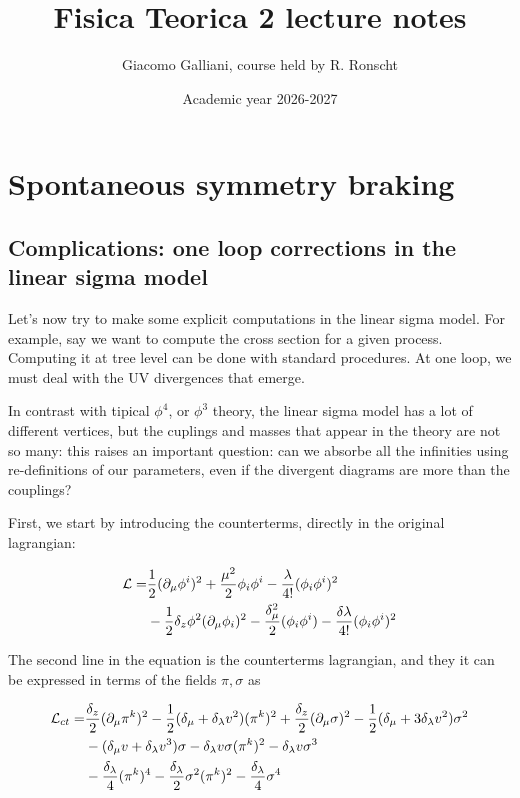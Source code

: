 \documentclass[11pt]{report}
\title{\Huge{\textbf{Fisica Teorica 2 lecture notes}}}
\author{Giacomo Galliani, course held by R. Ronscht}
\date{Academic year 2026-2027}
\renewcommand{\contentsname}{Indice}
\begin{document}
\maketitle
\newpage%
\pdfbookmark[section]{\contentsname}{toc}
\tableofcontents
\pagebreak

\chapter{Spontaneous symmetry braking}

\section{Complications: one loop corrections in the linear sigma model}

Let's now try to make some explicit computations in the linear sigma model. For example, say we want to compute the cross section for a given process. Computing it at tree level can be done with standard procedures. At one loop, we must deal with the UV divergences that emerge. 

In contrast with tipical \(\phi^4\), or \(\phi^3\) theory, the linear sigma model has a lot of different vertices, but the cuplings and masses that appear in the theory are not so many: this raises an important question: can we absorbe all the infinities using re-definitions of our parameters, even if the divergent diagrams are more than the couplings? 

First, we start by introducing the counterterms, directly in the original lagrangian: 

\begin{align}
    \mathcal{L} = &\frac{1}{2}(\partial_\mu \phi^i)^2 +\frac{\mu^2}{2}\phi_i \phi^i - \frac{\lambda}{4!}(\phi_i \phi^i)^2 \notag \\
    &-\frac{1}{2}\delta_z \phi^2 (\partial_\mu \phi_i)^2 - \frac{\delta_\mu^2}{2}(\phi_i \phi^i) - \frac{\delta \lambda}{4!}(\phi_i \phi^i)^2 
\end{align}

The second line in the equation is the counterterms lagrangian, and they it can be expressed in terms of the fields \(\pi, \sigma\) as 

\begin{align}
    \mathcal{L}_{ct} = &\frac{\delta_z}{2}(\partial_\mu \pi^k)^2 - \frac{1}{2}(\delta_\mu + \delta_\lambda v^2)(\pi^k)^2 + \frac{\delta_z}{2}(\partial_\mu \sigma)^2 - \frac{1}{2}(\delta_\mu + 3\delta_\lambda v^2)\sigma^2 \notag \\ 
    & -(\delta_\mu v + \delta_\lambda v^3)\sigma - \delta_\lambda v \sigma(\pi^k)^2 - \delta_\lambda v \sigma^3 \notag \\ 
    & -\frac{\delta_\lambda}{4}(\pi^k)^4 - \frac{\delta_\lambda}{2}\sigma^2 (\pi^k)^2 - \frac{\delta_\lambda}{4}\sigma^4
\end{align}
\end{document}
